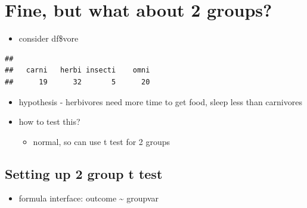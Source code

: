\documentclass[
]{book}
\newenvironment{Shaded}{\begin{snugshade}}{\end{snugshade}}
\newcommand{\DataTypeTok}[1]{\textcolor[rgb]{0.13,0.29,0.53}{#1}}
\newcommand{\KeywordTok}[1]{\textcolor[rgb]{0.13,0.29,0.53}{\textbf{#1}}}
\newcommand{\NormalTok}[1]{#1}
\newcommand{\OperatorTok}[1]{\textcolor[rgb]{0.81,0.36,0.00}{\textbf{#1}}}
\newcommand{\StringTok}[1]{\textcolor[rgb]{0.31,0.60,0.02}{#1}}
\providecommand{\tightlist}{%
  \setlength{\itemsep}{0pt}\setlength{\parskip}{0pt}}
\begin{document}
\hypertarget{fine-but-what-about-2-groups}{%
\section{Fine, but what about 2 groups?}\label{fine-but-what-about-2-groups}}

\begin{itemize}
\tightlist
\item
  consider df\$vore
\end{itemize}

\begin{Shaded}
\end{Shaded}

\begin{verbatim}
## 
##   carni   herbi insecti    omni 
##      19      32       5      20
\end{verbatim}

\begin{itemize}
\tightlist
\item
  hypothesis - herbivores need more time to get food, sleep less than carnivores
\item
  how to test this?

  \begin{itemize}
  \tightlist
  \item
    normal, so can use t test for 2 groups
  \end{itemize}
\end{itemize}

\hypertarget{setting-up-2-group-t-test}{%
\subsection{Setting up 2 group t test}\label{setting-up-2-group-t-test}}

\begin{itemize}
\tightlist
\item
  formula interface: outcome \textasciitilde{} groupvar
\end{itemize}

\begin{Shaded}
\end{Shaded}
\end{document}
